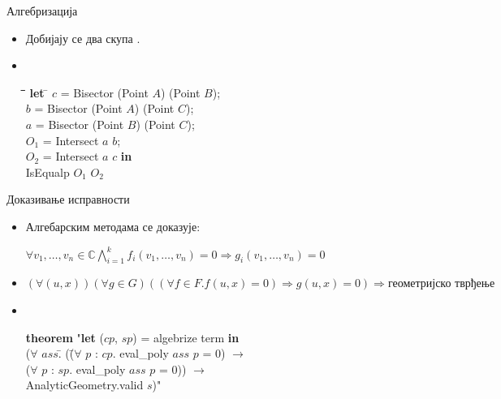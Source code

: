 \documentclass[slidestop, compress, mathserif, containsverbatim, xcolor=dvipsnames]{beamer}
\begin{document}
\begin{frame}{Алгебризација}
  \begin{itemize}
  \item Добијају се два скупа . \vfill
  \item \begin{footnotesize} {\tt
    \begin{tabbing}
      \hspace{5mm}\=\hspace{5mm}\=\hspace{5mm}\=\hspace{5mm}\=\hspace{5mm}\=\kill
      \textbf{let} \= $c$ = Bisector (Point $A$) (Point $B$); \\
      \> $b$ = Bisector (Point $A$) (Point $C$); \\
      \> $a$ = Bisector (Point $B$) (Point $C$); \\
      \> $O_1$ = Intersect $a$ $b$; \\
      \> $O_2$ = Intersect $a$ $c$ \textbf{in} \\
      \> IsEqualp $O_1$ $O_2$
    \end{tabbing}
  } \end{footnotesize}
  \end{itemize}
\end{frame}


\begin{frame}{Доказивање исправности}
  \begin{itemize}
  \item Алгебарским методама се доказује: \begin{footnotesize}
    $ \forall v_1, \ldots, v_n \in \mathbb{C} \bigwedge_{i=1}^k
    f_i(v_1, \ldots, v_n) = 0 \Longrightarrow g_i(v_1, \ldots, v_n) =
    0 $ \end{footnotesize} \vfill
  \item \begin{footnotesize} $ (\forall (u, x))(\forall g\in G)( (\forall f\in F. f(u,x) =
    0) \Rightarrow g(u,x) = 0) \Rightarrow \textrm{геометријско
      тврђење} $ \end{footnotesize} \vfill
  \item \begin{footnotesize} {\tt
    \begin{tabbing}
      {\bf theorem} "{\bf let} ($cp$, $sp$) = algebrize term {\bf in} \\
      ({\bf $\forall$} $ass$\=. (\= ({\bf $\forall$} $p$ : $cp$. eval\_poly $ass$ $p$ = 0) $\longrightarrow$ \\
       \>                 \> ({\bf $\forall$} $p$ : $sp$. eval\_poly $ass$ $p$ = 0)) $\longrightarrow$ \\
       \> AnalyticGeometry.valid $s$)"
       \end{tabbing}
      } \end{footnotesize} \vfill
  \end{itemize}
\end{frame}
\end{document}
